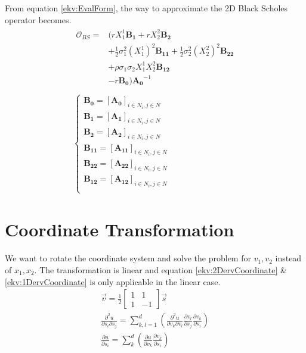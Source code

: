 \documentclass[a4paper]{article}      %
\begin{document}
From equation \ref{ekv:EvalForm}, the way to approximate the 2D Black Scholes operator becomes.
\begin{gather}
\begin{aligned}
 \mathcal{O}_{BS} =& ( rX_1^1 \mathbf{B_1} + rX_2^2 \mathbf{B_2} \\
&+ \frac{1}{2} \sigma_1^2 (X_1^1)^2 \mathbf{B_{11}} 
+ \frac{1}{2} \sigma_2^2 (X_2^2)^2 \mathbf{B_{22}} \\
&+ \rho \sigma_1 \sigma_2 X_1^1 X_2^2 \mathbf{B_{12}} \\
& - r\mathbf{B_0} ) \mathbf{A_0}^{-1} \\
\end{aligned}
\\
\begin{cases}
\mathbf{B_0} = [\mathbf{A_0}]_{i\in N_{i},j \in N} \\
\mathbf{B_1} = [\mathbf{A_1}]_{i\in N_{i},j \in N} \\
\mathbf{B_2} = [\mathbf{A_2}]_{i\in N_{i},j \in N} \\
\mathbf{B_{11}} = [\mathbf{A_{11}}]_{i\in N_{i},j \in N} \\
\mathbf{B_{22}} = [\mathbf{A_{22}}]_{i\in N_{i},j \in N} \\
\mathbf{B_{12}} = [\mathbf{A_{12}}]_{i\in N_{i},j \in N} \\
\end{cases}
\end{gather}
\section*{Coordinate Transformation}
We want to rotate the coordinate system and solve the problem for $v_1, v_2$ instead of  $x_1, x_2$. The transformation is linear and equation \ref{ekv:2DervCoordinate} \& \ref{ekv:1DervCoordinate} is only applicable in the linear case. 
\begin{gather}
\vec{v} = \frac{1}{2}
\begin{bmatrix}
1 & 1 \\ 1 & -1
\end{bmatrix}
\vec{s} \\
\frac{\partial^2 u}{\partial {s_i}\partial {s_j}} =
\sum_{k,l = 1}^d 
\left( 
\frac{\partial^2 u}{\partial {v_k}\partial {v_l}}
\frac{\partial v_l}{\partial {s_j}}
\frac{\partial v_k}{\partial {s_i}}
\right) \label{ekv:2DervCoordinate}\\
\frac{\partial u}{\partial s_i}
= \sum_k^d
\left(
\frac{\partial u}{\partial v_k}
\frac{\partial v_k}{\partial s_i}
\right) \label{ekv:1DervCoordinate}
\end{gather}
\end{document}
